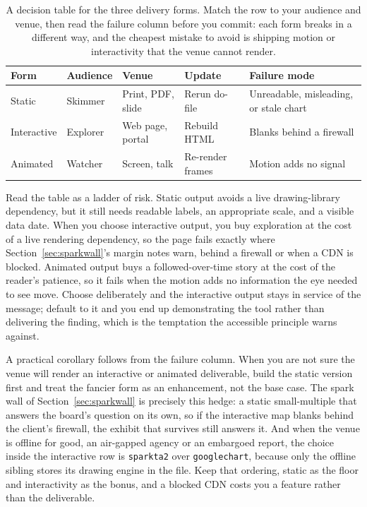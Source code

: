 \documentclass[
    a4paper,
    fontsize=10pt,
    twoside=true,
    numbers=noenddot,
]{kaobook}
\begin{document}
\begin{table}[htbp]
\centering
\caption[Choosing static, interactive, or animated]{A decision table for the three delivery forms. Match the row to your audience and venue, then read the failure column before you commit: each form breaks in a different way, and the cheapest mistake to avoid is shipping motion or interactivity that the venue cannot render.}
\label{tab:interactive-choice}
{\footnotesize
\begin{tabular}{@{}llllp{6.0cm}@{}}
\hline
Form & Audience & Venue & Update & Failure mode \\
\hline
Static & Skimmer & Print, PDF, slide & Rerun do-file & Unreadable, misleading, or stale chart \\
Interactive & Explorer & Web page, portal & Rebuild HTML & Blanks behind a firewall \\
Animated & Watcher & Screen, talk & Re-render frames & Motion adds no signal \\
\hline
\end{tabular}
}
\end{table}

Read the table as a ladder of risk. Static output avoids a live drawing-library dependency, but it still needs readable labels, an appropriate scale, and a visible data date. When you choose interactive output, you buy exploration at the cost of a live rendering dependency, so the page fails exactly where Section~\ref{sec:sparkwall}'s margin notes warn, behind a firewall or when a CDN is blocked. Animated output buys a followed-over-time story at the cost of the reader's patience, so it fails when the motion adds no information the eye needed to see move. Choose deliberately and the interactive output stays in service of the message; default to it and you end up demonstrating the tool rather than delivering the finding, which is the temptation the accessible principle warns against.

A practical corollary follows from the failure column. When you are not sure the venue will render an interactive or animated deliverable, build the static version first and treat the fancier form as an enhancement, not the base case. The spark wall of Section~\ref{sec:sparkwall} is precisely this hedge: a static small-multiple that answers the board's question on its own, so if the interactive map blanks behind the client's firewall, the exhibit that survives still answers it. And when the venue is offline for good, an air-gapped agency or an embargoed report, the choice inside the interactive row is \texttt{sparkta2} over \texttt{googlechart}, because only the offline sibling stores its drawing engine in the file. Keep that ordering, static as the floor and interactivity as the bonus, and a blocked CDN costs you a feature rather than the deliverable.
\end{document}
